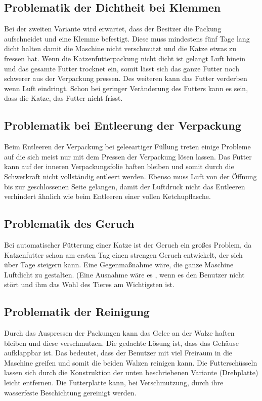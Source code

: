 \subsection{Problematik der Dichtheit bei Klemmen}

Bei der zweiten Variante wird erwartet, dass der Besitzer die Packung aufschneidet und eine Klemme befestigt. Diese muss mindestens fünf Tage lang dicht halten damit die Maschine nicht verschmutzt und die Katze etwas zu fressen hat. Wenn die Katzenfutterpackung nicht dicht ist gelangt Luft hinein und das gesamte Futter trocknet ein, somit lässt sich das ganze Futter noch schwerer aus der Verpackung pressen. Des weiteren kann das Futter verderben wenn Luft eindringt. Schon bei geringer Veränderung des Futters kann es sein, dass die Katze, das Futter nicht frisst.

\subsection{Problematik bei Entleerung der Verpackung}

Beim Entleeren der Verpackung bei geleeartiger Füllung treten einige Probleme auf die sich meist nur mit dem Pressen der Verpackung lösen lassen. Das Futter kann auf der inneren Verpackungsfolie haften bleiben und somit durch die Schwerkraft nicht vollständig entleert werden. Ebenso muss Luft von der Öffnung bis zur geschlossenen Seite gelangen, damit der Luftdruck nicht das Entleeren verhindert ähnlich wie beim Entleeren einer vollen Ketchupflasche. 

\subsection{Problematik des Geruch}

Bei automatischer Fütterung einer Katze ist der Geruch ein großes Problem, da Katzenfutter schon am ersten Tag einen strengen Geruch entwickelt, der sich über Tage steigern kann. Eine Gegenmaßnahme wäre, die ganze Maschine Luftdicht zu gestalten. (Eine Ausnahme wäre es , wenn es den Benutzer nicht stört und ihm das Wohl des Tieres am Wichtigsten ist. 

\subsection{Problematik der Reinigung}

Durch das Auspressen der Packungen kann das Gelee an der Walze haften bleiben und diese verschmutzen. Die gedachte Lösung ist, dass das Gehäuse aufklappbar ist. Das bedeutet, dass der Benutzer mit viel Freiraum in die Maschine greifen und  somit die beiden Walzen reinigen kann. Die Futterschüsseln lassen sich durch die Konstruktion der unten beschriebenen Variante (Drehplatte) leicht entfernen. Die Futterplatte kann, bei Verschmutzung, durch ihre wasserfeste Beschichtung gereinigt werden.

